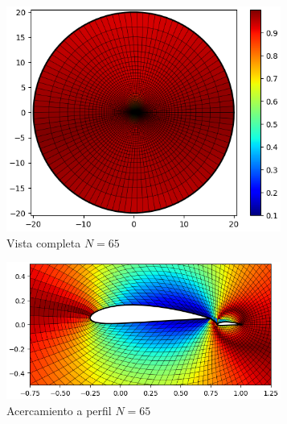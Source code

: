 \documentclass[letterpaper, openright, 12pt]{book}
\begin{document}
    \begin{figure}[htbp!]
        \centering
        \begin{subfigure}[c]{0.48\textwidth}
            \includegraphics[keepaspectratio, width=0.99\textwidth]
                {./img/naca4415_flap_n_65_skew_far}
            \caption{Vista completa $N=65$}
            \label{fig:naca4415_flap_n_65_skew_far}
        \end{subfigure}
        \hfill
        \begin{subfigure}[c]{0.48\textwidth}
            \includegraphics[keepaspectratio, width=0.99\textwidth]
                {./img/naca4415_flap_n_65_skew_close}
            \caption{Acercamiento a perfil $N=65$}
            \label{fig:naca4415_flap_n_65_close}
        \end{subfigure}
        \begin{subfigure}[c]{0.48\textwidth}

\end{subfigure}
\end{figure}
\end{document}
